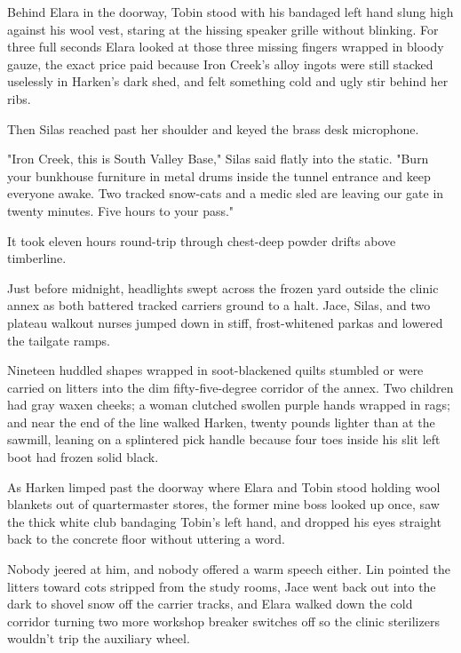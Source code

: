 Behind Elara in the doorway, Tobin stood with his bandaged left hand slung high against his wool vest, staring at the hissing speaker grille without blinking. For three full seconds Elara looked at those three missing fingers wrapped in bloody gauze, the exact price paid because Iron Creek's alloy ingots were still stacked uselessly in Harken's dark shed, and felt something cold and ugly stir behind her ribs.

Then Silas reached past her shoulder and keyed the brass desk microphone.

"Iron Creek, this is South Valley Base," Silas said flatly into the static. "Burn your bunkhouse furniture in metal drums inside the tunnel entrance and keep everyone awake. Two tracked snow-cats and a medic sled are leaving our gate in twenty minutes. Five hours to your pass."

\bigskip

It took eleven hours round-trip through chest-deep powder drifts above timberline.

Just before midnight, headlights swept across the frozen yard outside the clinic annex as both battered tracked carriers ground to a halt. Jace, Silas, and two plateau walkout nurses jumped down in stiff, frost-whitened parkas and lowered the tailgate ramps.

Nineteen huddled shapes wrapped in soot-blackened quilts stumbled or were carried on litters into the dim fifty-five-degree corridor of the annex. Two children had gray waxen cheeks; a woman clutched swollen purple hands wrapped in rags; and near the end of the line walked Harken, twenty pounds lighter than at the sawmill, leaning on a splintered pick handle because four toes inside his slit left boot had frozen solid black.

As Harken limped past the doorway where Elara and Tobin stood holding wool blankets out of quartermaster stores, the former mine boss looked up once, saw the thick white club bandaging Tobin's left hand, and dropped his eyes straight back to the concrete floor without uttering a word.

Nobody jeered at him, and nobody offered a warm speech either. Lin pointed the litters toward cots stripped from the study rooms, Jace went back out into the dark to shovel snow off the carrier tracks, and Elara walked down the cold corridor turning two more workshop breaker switches off so the clinic sterilizers wouldn't trip the auxiliary wheel.
